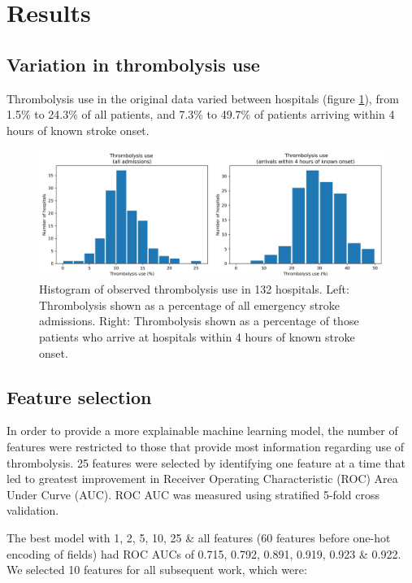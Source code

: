 \section{Results}

\subsection{Variation in thrombolysis use}

Thrombolysis use in the original data varied between hospitals (figure \ref{fig:observed_thrombolysis}), from 1.5\% to 24.3\% of all patients, and 7.3\% to 49.7\% of patients arriving within 4 hours of known stroke onset.

\begin{figure}
\centering
\includegraphics[width=1.0\textwidth]{./images/thrombolysis_hist}
\caption{Histogram of observed thrombolysis use in 132 hospitals. Left: Thrombolysis shown as a percentage of all emergency stroke admissions. Right: Thrombolysis shown as a percentage of those patients who arrive at hospitals within 4 hours of known stroke onset.}
\label{fig:observed_thrombolysis}
\end{figure}

\subsection{Feature selection}

In order to provide a more explainable machine learning model, the number of features were restricted to those that provide most information regarding use of thrombolysis. 25 features were selected by identifying one feature at a time that led to greatest improvement in Receiver Operating Characteristic (ROC) Area Under Curve (AUC). ROC AUC was measured using stratified 5-fold cross validation.

The best model with 1, 2, 5, 10, 25 \& all features (60 features before one-hot encoding of fields) had ROC AUCs of 0.715, 0.792, 0.891, 0.919, 0.923 \& 0.922. We selected 10 features for all subsequent work, which were:

